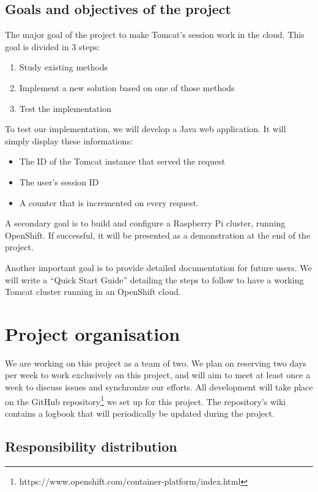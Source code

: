 \documentclass[11pt,a4paper]{article}
\begin{document}
\subsection{Goals and objectives of the project}

The major goal of the project to make Tomcat's session work in the cloud. This
goal is divided in 3 steps:
\begin{enumerate}
    \item Study existing methods
    \item Implement a new solution based on one of those methods
    \item Test the implementation
\end{enumerate}

To test our implementation, we will develop a Java web application. It
will simply display these informations:

\begin{itemize}
    \item The ID of the Tomcat instance that served the request
    \item The user's session ID
    \item A counter that is incremented on every request.
\end{itemize}

A secondary goal is to build and configure a Raspberry Pi cluster, running
OpenShift. If successful, it will be presented as a demonstration at the end of
the project.

Another important goal is to provide detailed documentation for future users.
We will write a ``Quick Start Guide'' detailing the steps to follow to have a
working Tomcat cluster running in an OpenShift cloud.


\section{Project organisation}

We are working on this project as a team of two. We plan on reserving two days
per week to work exclusively on this project, and will aim to meet at least
once a week to discuss issues and synchronize our efforts. All development will
take place on the GitHub
repository\footnote{https://www.openshift.com/container-platform/index.html}
we set up for this project. The repository's wiki contains a logbook that will
periodically be updated during the project.

\subsection{Responsibility distribution}
\end{document}
